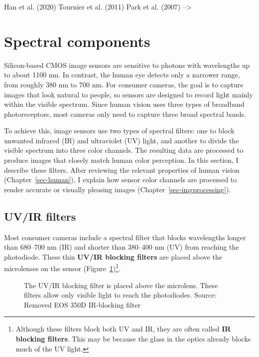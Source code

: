 \documentclass[
  letterpaper,
]{book}
\begin{document}
Han et al. (2020) Tournier et al. (2011) Park et al. (2007)
--\textgreater{}

\section{Spectral components}\label{sec-sensor-wavelength}

Silicon-based CMOS image sensors are sensitive to photons with
wavelengths up to about 1100 nm. In contrast, the human eye detects only
a narrower range, from roughly 380 nm to 700 nm. For consumer cameras,
the goal is to capture images that look natural to people, so sensors
are designed to record light mainly within the visible spectrum. Since
human vision uses three types of broadband photoreceptors, most cameras
only need to capture three broad spectral bands.

To achieve this, image sensors use two types of spectral filters: one to
block unwanted infrared (IR) and ultraviolet (UV) light, and another to
divide the visible spectrum into three color channels. The resulting
data are processed to produce images that closely match human color
perception. In this section, I describe these filters. After reviewing
the relevant properties of human vision (Chapter~\ref{sec-human}), I
explain how sensor color channels are processed to render accurate or
visually pleasing images (Chapter~\ref{sec-imgprocessing}).

\subsection{UV/IR filters}\label{sec-sensor-irfilter}

Most consumer cameras include a spectral filter that blocks wavelengths
longer than 680--700 nm (IR) and shorter than 380--400 nm (UV) from
reaching the photodiode. These thin \textbf{UV/IR blocking filters} are
placed above the microlenses on the sensor
(Figure~\ref{fig-sensor-uvir})\footnote{Although these filters block
  both UV and IR, they are often called \textbf{IR blocking filters}.
  This may be because the glass in the optics already blocks much of the
  UV light.}.

\begin{figure}


\caption{\label{fig-sensor-uvir}The UV/IR blocking filter is placed
above the microlens. These filters allow only visible light to reach the
photodiodes. Source: Removed EOS 350D IR-blocking filter}

\end{figure}%
\end{document}
